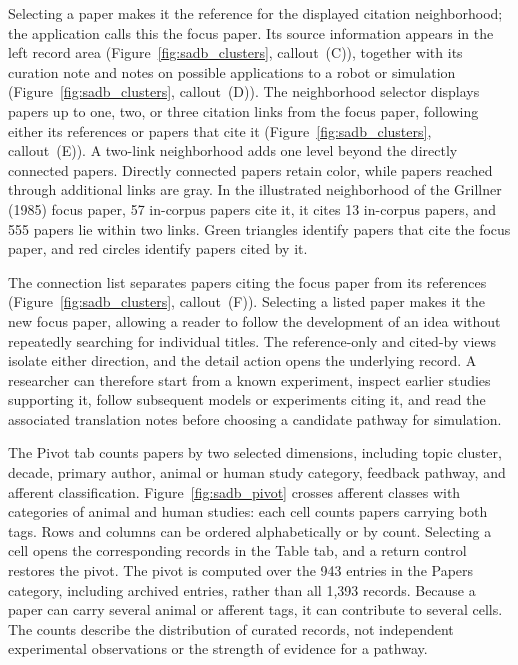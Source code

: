 Selecting a paper makes it the reference for the displayed citation neighborhood; the application calls this the focus paper. Its source information appears in the left record area (Figure~\ref{fig:sadb_clusters}, callout~(C)), together with its curation note and notes on possible applications to a robot or simulation (Figure~\ref{fig:sadb_clusters}, callout~(D)). The neighborhood selector displays papers up to one, two, or three citation links from the focus paper, following either its references or papers that cite it (Figure~\ref{fig:sadb_clusters}, callout~(E)). A two-link neighborhood adds one level beyond the directly connected papers. Directly connected papers retain color, while papers reached through additional links are gray. In the illustrated neighborhood of the Grillner (1985) focus paper, 57 in-corpus papers cite it, it cites 13 in-corpus papers, and 555 papers lie within two links. Green triangles identify papers that cite the focus paper, and red circles identify papers cited by it.

The connection list separates papers citing the focus paper from its references (Figure~\ref{fig:sadb_clusters}, callout~(F)). Selecting a listed paper makes it the new focus paper, allowing a reader to follow the development of an idea without repeatedly searching for individual titles. The reference-only and cited-by views isolate either direction, and the detail action opens the underlying record. A researcher can therefore start from a known experiment, inspect earlier studies supporting it, follow subsequent models or experiments citing it, and read the associated translation notes before choosing a candidate pathway for simulation.

The Pivot tab counts papers by two selected dimensions, including topic cluster, decade, primary author, animal or human study category, feedback pathway, and afferent classification. Figure~\ref{fig:sadb_pivot} crosses afferent classes with categories of animal and human studies: each cell counts papers carrying both tags. Rows and columns can be ordered alphabetically or by count. Selecting a cell opens the corresponding records in the Table tab, and a return control restores the pivot. The pivot is computed over the 943 entries in the Papers category, including archived entries, rather than all 1,393 records. Because a paper can carry several animal or afferent tags, it can contribute to several cells. The counts describe the distribution of curated records, not independent experimental observations or the strength of evidence for a pathway.

